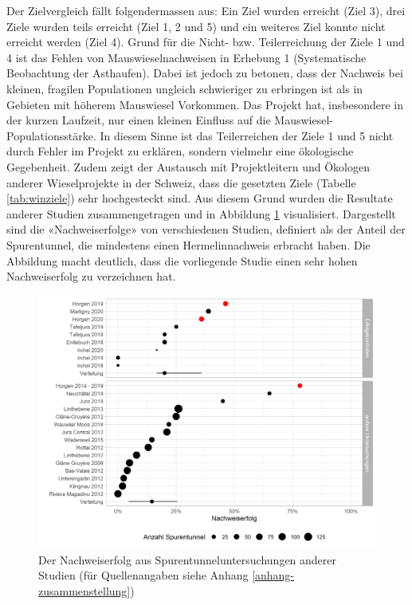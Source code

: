 \documentclass[
]{scrbook}
\begin{document}
Der Zielvergleich fällt folgendermassen aus: Ein Ziel wurden erreicht (Ziel 3), drei Ziele wurden teils erreicht (Ziel 1, 2 und 5) und ein weiteres Ziel konnte nicht erreicht werden (Ziel 4). Grund für die Nicht- bzw. Teilerreichung der Ziele 1 und 4 ist das Fehlen von Mauswieselnachweisen in Erhebung 1 (Systematische Beobachtung der Asthaufen). Dabei ist jedoch zu betonen, dass der Nachweis bei kleinen, fragilen Populationen ungleich schwieriger zu erbringen ist als in Gebieten mit höherem Mauswiesel Vorkommen. Das Projekt hat, insbesondere in der kurzen Laufzeit, nur einen kleinen Einfluss auf die Mauswiesel-Populationsstärke. In diesem Sinne ist das Teilerreichen der Ziele 1 und 5 nicht durch Fehler im Projekt zu erklären, sondern vielmehr eine ökologische Gegebenheit. Zudem zeigt der Austausch mit Projektleitern und Ökologen anderer Wieselprojekte in der Schweiz, dass die gesetzten Ziele (Tabelle \ref{tab:winziele}) sehr hochgesteckt sind. Aus diesem Grund wurden die Resultate anderer Studien zusammengetragen und in Abbildung \ref{fig:kontext} visualisiert. Dargestellt sind die «Nachweiserfolge» von verschiedenen Studien, definiert als der Anteil der Spurentunnel, die mindestens einen Hermelinnachweis erbracht haben. Die Abbildung macht deutlich, dass die vorliegende Studie einen sehr hohen Nachweiserfolg zu verzeichnen hat.



\begin{figure}
\includegraphics[width=1\linewidth]{images/kontext} \caption{Der Nachweiserfolg aus Spurentunneluntersuchungen anderer Studien (für Quellenangaben siehe Anhang \ref{anhang-zusammenstellung})}\label{fig:kontext}
\end{figure}
\end{document}
